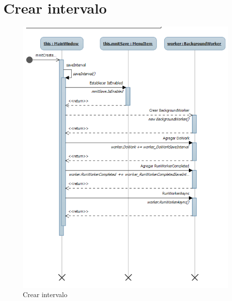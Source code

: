\section{Crear intervalo}
\begin{figure}[H]
\centering
\includegraphics[width=0.9\linewidth]{./Figures/Secuencia/CreateInterval}
\caption{Crear intervalo}
\label{fig:CreateInterval}
\end{figure}

